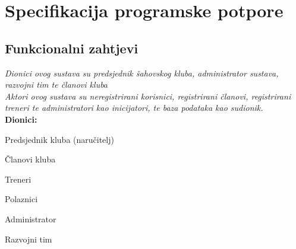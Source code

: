 \documentclass{article}
\begin{document}
	\section{Specifikacija programske potpore}
		\subsection{Funkcionalni zahtjevi}
		\textit{Dionici ovog sustava su predsjednik šahovskog kluba, administrator sustava, razvojni tim te članovi kluba}\\
		
		\noindent \textit{Aktori ovog sustava su neregistrirani korisnici, registrirani članovi, registrirani treneri te administratori kao inicijatori, te baza podataka kao sudionik. }\\
		
		\noindent \textbf{Dionici:}
		
		\begin{packed_enum}
			
			\item Predsjednik kluba (naručitelj) 
			\item Članovi kluba 
			\begin{packed_enum}
				\item Treneri
				\item Polaznici
			\end{packed_enum}
			\item Administrator 
			\item Razvojni tim 
			
		\end{packed_enum}
	
\end{document}
